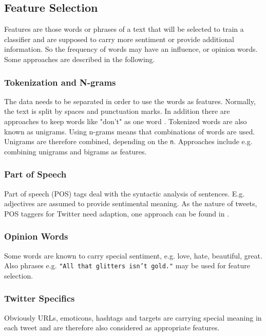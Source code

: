 \documentclass{acm_proc_article-sp}
\begin{document}
\subsection{Feature Selection} Features are those words or phrases of a text
that will be selected to train a classifier and are  supposed to carry more
sentiment or provide additional information. So the frequency of words may have
an influence, or opinion words. Some approaches are described in the following.

\subsubsection{Tokenization and N-grams} The data needs to be separated in
order to use the words as features. Normally, the text is split by spaces and
punctuation marks. In addition there are approaches to keep words like "don't"
as one word \cite{pak2010twitter}. Tokenized words are also known as unigrams.
Using n-grams means that combinations of words are used. Unigrams are therefore
combined, depending on the \texttt{n}. Approaches include e.g. combining
unigrams and bigrams as features.  \cite{liu2010sentimentanalysis,
go2009twitter}

\subsubsection{Part of Speech} Part of speech (POS) tags deal with the
syntactic analysis of sentences. E.g. adjectives are assumed to provide
sentimental meaning. \cite{liu2010sentimentanalysis} As the nature of tweets,
POS taggers for Twitter need adaption, one approach can be found in
\cite{gimpel2011part}. 

\subsubsection{Opinion Words} Some words are known to carry special sentiment,
e.g. love, hate, beautiful, great. Also phrases e.g. \texttt{"All that glitters
isn't gold."} may be used for feature selection.
\cite{liu2010sentimentanalysis}

\subsubsection{Twitter Specifics} Obviously URLs, emoticons, hashtags and
targets are carrying special meaning in each tweet and are therefore also
considered as appropriate features. \cite{gimpel2011part}
\end{document}
